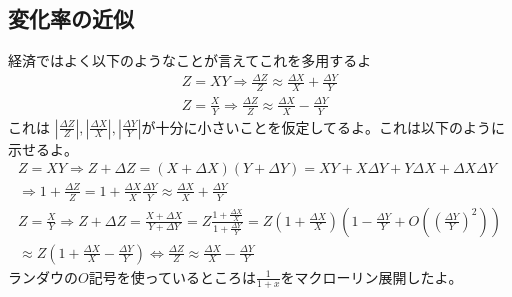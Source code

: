 \documentclass[a4paper, 12pt]{article}
\begin{document}
\subsection{変化率の近似}
経済ではよく以下のようなことが言えてこれを多用するよ
\begin{displaymath}
  \begin{array}{l}
    Z=XY \Rightarrow \frac{\Delta Z}{Z} \approx \frac{\Delta X}{X}+\frac{\Delta Y}{Y}\\
    Z=\frac{X}{Y} \Rightarrow \frac{\Delta Z}{Z} \approx \frac{\Delta X}{X}-\frac{\Delta Y}{Y}
  \end{array}
\end{displaymath}
これは $|\frac{\Delta Z}{Z}|,|\frac{\Delta X}{X}|, |\frac{\Delta Y}{Y}|$が十分に小さいことを仮定してるよ。これは以下のように示せるよ。
\begin{displaymath}
  \begin{array}{l}
    Z=XY \Rightarrow Z+\Delta Z =(X+\Delta X)(Y+\Delta Y)=XY+X\Delta Y+Y\Delta X+\Delta X\Delta Y \\
    \Rightarrow 1+\frac{\Delta Z}{Z}=1+\frac{\Delta X}{X}\frac{\Delta Y}{Y} \approx \frac{\Delta X}{X}+\frac{\Delta Y}{Y}\\
    Z=\frac{X}{Y} \Rightarrow Z+\Delta Z =\frac{X+\Delta X}{Y+\Delta Y}=Z\frac{1+\frac{\Delta X}{X}}{1+\frac{\Delta Y}{Y}}=Z\left(1+\frac{\Delta X}{X}\right)\left(1-\frac{\Delta Y}{Y}+O\left(\left(\frac{\Delta Y}{Y}\right)^2\right)\right) \\
    \approx Z\left(1+\frac{\Delta X}{X}-\frac{\Delta Y}{Y}\right) \Leftrightarrow \frac{\Delta Z}{Z} \approx \frac{\Delta X}{X}-\frac{\Delta Y}{Y}
  \end{array}
\end{displaymath}
ランダウの$O$記号を使っているところは$\frac{1}{1+x}$をマクローリン展開したよ。
\end{document}
